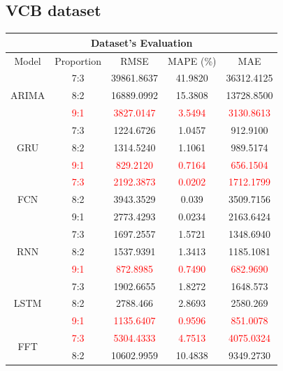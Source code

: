 \documentclass{ieeeojies}
\begin{document}
\subsection{VCB dataset} 
\begin{table}[H]
    \centering
    \begin{tabular}{|c|c|c|c|c|}
    \hline
    \multicolumn{5}{|c|}{\textbf{Dataset's Evaluation}} \\ \hline
    \centering Model & Proportion & RMSE & MAPE (\%) & MAE \\ \hline
        \multirow{3}{*}{ARIMA} & 7:3 & 39861.8637 & 41.9820 & 36312.4125 \\
        & 8:2 & 16889.0992 & 15.3808 & 13728.8500 \\
        & \textcolor{red}{9:1} & \textcolor{red}{3827.0147} & \textcolor{red}{3.5494} & \textcolor{red}{3130.8613} \\ \hline
        \multirow{3}{*}{GRU} & 7:3 & 1224.6726 & 1.0457 & 912.9100 \\
        & 8:2 & 1314.5240 & 1.1061 & 989.5174 \\
        & \textcolor{red}{9:1} & \textcolor{red}{829.2120} & \textcolor{red}{0.7164} & \textcolor{red}{656.1504} \\ \hline
        \multirow{3}{*}{FCN} & \textcolor{red}{7:3} & \textcolor{red}{2192.3873} & \textcolor{red}{0.0202} & \textcolor{red}{1712.1799} \\
        & 8:2 & 3943.3529 & 0.039 & 3509.7156 \\
        & 9:1 & 2773.4293 & 0.0234 & 2163.6424 \\ \hline
        \multirow{3}{*}{RNN} & 7:3 & 1697.2557 & 1.5721 & 1348.6940 \\
        & 8:2 & 1537.9391 & 1.3413 & 1185.1081 \\
        & \textcolor{red}{9:1} & \textcolor{red}{872.8985} & \textcolor{red}{0.7490} & \textcolor{red}{682.9690} \\ \hline
        \multirow{3}{*}{LSTM} & 7:3 & 1902.6655 & 1.8272 & 1648.573 \\
        & 8:2 & 2788.466 & 2.8693 & 2580.269 \\
        & \textcolor{red}{9:1} & \textcolor{red}{1135.6407} & \textcolor{red}{0.9596} & \textcolor{red}{851.0078} \\ \hline
        \multirow{3}{*}{FFT} & \textcolor{red}{7:3} & \textcolor{red}{5304.4333} & \textcolor{red}{4.7513} & \textcolor{red}{4075.0324} \\
        & 8:2 & 10602.9959 & 10.4838 & 9349.2730 \\

\end{tabular}
\end{table}
\end{document}
